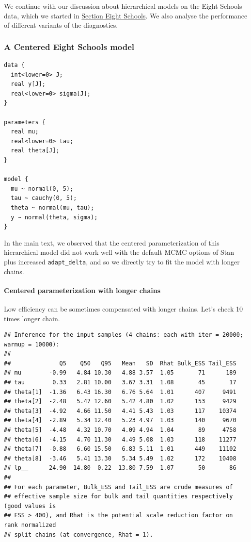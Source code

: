 \documentclass[american,]{article}
\let\oldparagraph\paragraph
\renewcommand{\paragraph}[1]{\oldparagraph{#1}\mbox{}}
\begin{document}
We continue with our discussion about hierarchical models on the Eight
Schools data, which we started in
\protect\hyperlink{eightschools}{Section Eight Schools}. We also analyse
the performance of different variants of the diagnostics.

\hypertarget{a-centered-eight-schools-model-1}{%
\subsubsection*{A Centered Eight Schools
model}\label{a-centered-eight-schools-model-1}}

\begin{verbatim}
data {
  int<lower=0> J;
  real y[J];
  real<lower=0> sigma[J];
}

parameters {
  real mu;
  real<lower=0> tau;
  real theta[J];
}

model {
  mu ~ normal(0, 5);
  tau ~ cauchy(0, 5);
  theta ~ normal(mu, tau);
  y ~ normal(theta, sigma);
}
\end{verbatim}

In the main text, we observed that the centered parameterization of this
hierarchical model did not work well with the default MCMC options of
Stan plus increased \texttt{adapt\_delta}, and so we directly try to fit
the model with longer chains.

\hypertarget{centered-parameterization-with-longer-chains}{%
\paragraph{Centered parameterization with longer
chains}\label{centered-parameterization-with-longer-chains}}

Low efficiency can be sometimes compensated with longer chains. Let's
check 10 times longer chain.

\begin{verbatim}
## Inference for the input samples (4 chains: each with iter = 20000; warmup = 10000):
## 
##              Q5    Q50   Q95   Mean   SD  Rhat Bulk_ESS Tail_ESS
## mu        -0.99   4.84 10.30   4.88 3.57  1.05       71      189
## tau        0.33   2.81 10.00   3.67 3.31  1.08       45       17
## theta[1]  -1.36   6.43 16.30   6.76 5.64  1.01      407     9491
## theta[2]  -2.48   5.47 12.60   5.42 4.80  1.02      153     9429
## theta[3]  -4.92   4.66 11.50   4.41 5.43  1.03      117    10374
## theta[4]  -2.89   5.34 12.40   5.23 4.97  1.03      140     9670
## theta[5]  -4.48   4.32 10.70   4.09 4.94  1.04       89     4758
## theta[6]  -4.15   4.70 11.30   4.49 5.08  1.03      118    11277
## theta[7]  -0.88   6.60 15.50   6.83 5.11  1.01      449    11102
## theta[8]  -3.46   5.41 13.30   5.34 5.49  1.02      172    10408
## lp__     -24.90 -14.80  0.22 -13.80 7.59  1.07       50       86
## 
## For each parameter, Bulk_ESS and Tail_ESS are crude measures of 
## effective sample size for bulk and tail quantities respectively (good values is 
## ESS > 400), and Rhat is the potential scale reduction factor on rank normalized
## split chains (at convergence, Rhat = 1).
\end{verbatim}
\end{document}
